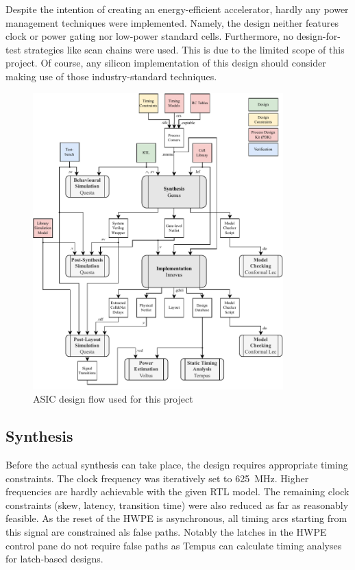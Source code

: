 \documentclass[a4paper, 12pt]{article}
\begin{document}
Despite the intention of creating an energy-efficient accelerator, hardly any power management techniques were implemented. Namely, the design neither features clock or power gating nor low-power standard cells. Furthermore, no design-for-test strategies like scan chains were used. This is due to the limited scope of this project. Of course, any silicon implementation of this design should consider making use of those industry-standard techniques.

\begin{figure} [h]
	\centering
	\includegraphics[width=0.86\textwidth]{design-flow.pdf}
	\caption{ASIC design flow used for this project}
	\label{fig:asic-flow}
\end{figure}

\clearpage

\subsection{Synthesis} \label{sec:asic:synthesis}

Before the actual synthesis can take place, the design requires appropriate timing constraints. The clock frequency was iteratively set to \SI{625}{MHz}. Higher frequencies are hardly achievable with the given RTL model. The remaining clock constraints (skew, latency, transition time) were also reduced as far as reasonably feasible. As the reset of the HWPE is asynchronous, all timing arcs starting from this signal are constrained als false paths. Notably the latches in the HWPE control pane do not require false paths as Tempus can calculate timing analyses for latch-based designs.
\end{document}
